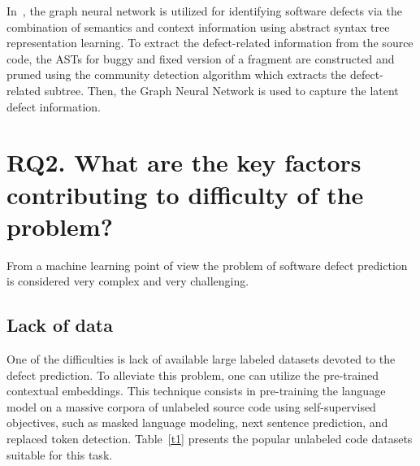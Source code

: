 \documentclass{article}
\begin{document}
In~\cite{XuWangAi2020}, the graph neural network is utilized for identifying software defects via the combination of semantics and context information using abstract syntax tree representation learning. To extract the defect-related information from the source code, the ASTs for buggy and fixed version of a fragment are constructed and pruned using the community detection algorithm which extracts the defect-related subtree.
Then, the Graph Neural Network is used to capture the latent defect information.




\section{RQ2. What are the key factors contributing to difficulty of the problem?}

From a machine learning point of view the problem of software defect prediction is considered very complex and very challenging. 

\subsection{Lack of data}

One of the difficulties is lack of available large labeled datasets devoted to the defect prediction. To alleviate this problem, one can utilize the pre-trained contextual embeddings. This technique consists in pre-training the language model on a massive corpora of unlabeled source code using self-supervised objectives, such as masked language modeling, next sentence prediction, and replaced token detection. Table~\ref{t1} presents the popular unlabeled code datasets suitable for this task.
\end{document}
